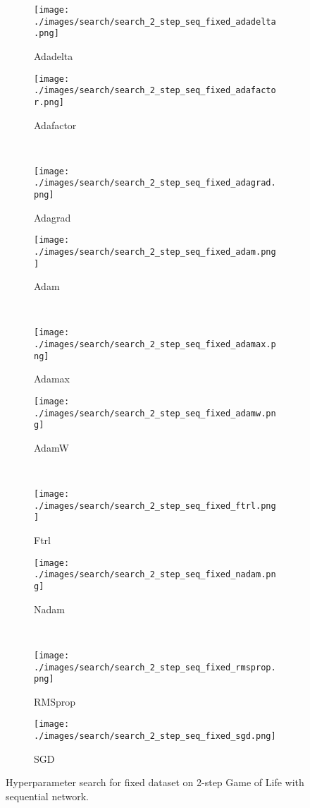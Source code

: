 \documentclass[letterpaper]{article} %
\begin{document}
\clearpage
\begin{figure*}[ht!]
    \centering
    \begin{subfigure}{.49\linewidth}
        \texttt{[image: ./images/search/search\_2\_step\_seq\_fixed\_adadelta.png]}
        \caption{Adadelta}
    \end{subfigure}
    \begin{subfigure}{.49\linewidth}
        \texttt{[image: ./images/search/search\_2\_step\_seq\_fixed\_adafactor.png]}
        \caption{Adafactor}
    \end{subfigure}
    \\
    \begin{subfigure}{.49\linewidth}
        \texttt{[image: ./images/search/search\_2\_step\_seq\_fixed\_adagrad.png]}
        \caption{Adagrad}
    \end{subfigure}
    \begin{subfigure}{.49\linewidth}
        \texttt{[image: ./images/search/search\_2\_step\_seq\_fixed\_adam.png]}
        \caption{Adam}
    \end{subfigure}
    \\
    \begin{subfigure}{.49\linewidth}
        \texttt{[image: ./images/search/search\_2\_step\_seq\_fixed\_adamax.png]}
        \caption{Adamax}
    \end{subfigure}
    \begin{subfigure}{.49\linewidth}
        \texttt{[image: ./images/search/search\_2\_step\_seq\_fixed\_adamw.png]}
        \caption{AdamW}
    \end{subfigure}
    \\
    \begin{subfigure}{.49\linewidth}
        \texttt{[image: ./images/search/search\_2\_step\_seq\_fixed\_ftrl.png]}
        \caption{Ftrl}
    \end{subfigure}
    \begin{subfigure}{.49\linewidth}
        \texttt{[image: ./images/search/search\_2\_step\_seq\_fixed\_nadam.png]}
        \caption{Nadam}
    \end{subfigure}
    \\
    \begin{subfigure}{.49\linewidth}
        \texttt{[image: ./images/search/search\_2\_step\_seq\_fixed\_rmsprop.png]}
        \caption{RMSprop}
    \end{subfigure}
    \begin{subfigure}{.49\linewidth}
        \texttt{[image: ./images/search/search\_2\_step\_seq\_fixed\_sgd.png]}
        \caption{SGD}
    \end{subfigure}
    \caption{Hyperparameter search for fixed dataset on 2-step Game of Life with sequential network.}
    \label{fig:search_2_seq_fixed}
\end{figure*}
\end{document}
